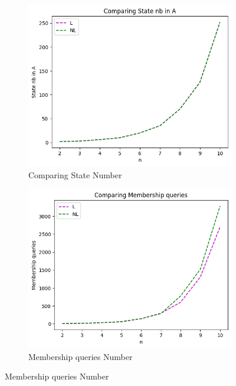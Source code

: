 \begin{figure}[!htb]
  \centering
  \begin{subfigure}[b]{0.3\textwidth}
    \includegraphics[width=\textwidth]{../statistics/plots/wrostRFSA/State nb in A.png}
    \caption{Comparing State Number}
    \label{fig:StateWrostRFSACompare}
  \end{subfigure}
  \begin{subfigure}[b]{0.3\textwidth}
    \includegraphics[width=\textwidth]{../statistics/plots/wrostRFSA/Membership queries.png}
    \caption{Membership queries Number}
    \label{fig:MemberWrostRFSACompare}
  \end{subfigure}

\end{figure}
